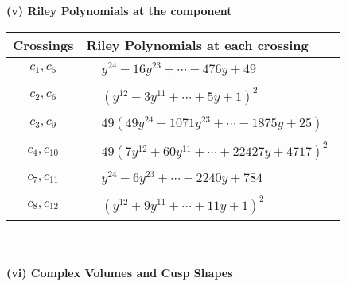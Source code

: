 \documentclass[1p]{elsarticle_modified}
\theoremstyle{definition}
\begin{document}
\newpage\renewcommand{\arraystretch}{1}
\flushleft \textbf{(v) Riley Polynomials at the component}\newline \\
\begin{tabular}{m{50pt}|m{274pt}}
Crossings & \hspace{64pt}Riley Polynomials at each crossing \\
\hline $$\begin{aligned}c_{1},c_{5}\end{aligned}$$&$\begin{aligned}
&y^{24}-16 y^{23}+\cdots-476 y+49
\end{aligned}$\\
\hline $$\begin{aligned}c_{2},c_{6}\end{aligned}$$&$\begin{aligned}
&(y^{12}-3 y^{11}+\cdots+5 y+1)^{2}
\end{aligned}$\\
\hline $$\begin{aligned}c_{3},c_{9}\end{aligned}$$&$\begin{aligned}
&49(49 y^{24}-1071 y^{23}+\cdots-1875 y+25)
\end{aligned}$\\
\hline $$\begin{aligned}c_{4},c_{10}\end{aligned}$$&$\begin{aligned}
&49(7 y^{12}+60 y^{11}+\cdots+22427 y+4717)^{2}
\end{aligned}$\\
\hline $$\begin{aligned}c_{7},c_{11}\end{aligned}$$&$\begin{aligned}
&y^{24}-6 y^{23}+\cdots-2240 y+784
\end{aligned}$\\
\hline $$\begin{aligned}c_{8},c_{12}\end{aligned}$$&$\begin{aligned}
&(y^{12}+9 y^{11}+\cdots+11 y+1)^{2}
\end{aligned}$\\
\hline
\end{tabular}\\~\\
\newpage\flushleft \textbf{(vi) Complex Volumes and Cusp Shapes}
\end{document}
